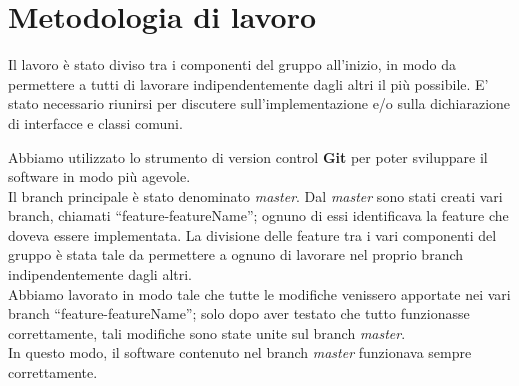 \documentclass[a4paper,12pt]{report}
\begin{document}
\section{Metodologia di lavoro}
Il lavoro è stato diviso tra i componenti del gruppo all'inizio, in modo da permettere a tutti di 
lavorare indipendentemente dagli altri il più possibile.
E' stato necessario riunirsi per discutere sull'implementazione e/o sulla dichiarazione di interfacce e 
classi comuni.

Abbiamo utilizzato lo strumento di version control \textbf{Git} per poter sviluppare 
il software in modo più agevole.
\\Il branch principale è stato denominato \textit{master}.
Dal \textit{master} sono stati creati vari branch, chiamati ``feature-featureName''; 
ognuno di essi identificava la feature che doveva essere implementata. 
La divisione delle feature tra i vari componenti del gruppo è stata tale da permettere 
a ognuno di lavorare nel proprio branch indipendentemente dagli altri.
\\Abbiamo lavorato in modo tale che tutte le modifiche venissero apportate nei vari branch 
``feature-featureName''; solo dopo aver testato che tutto funzionasse correttamente, 
tali modifiche sono state unite sul branch \textit{master}.
\\In questo modo, il software contenuto nel branch \textit{master} funzionava sempre correttamente.
\end{document}
